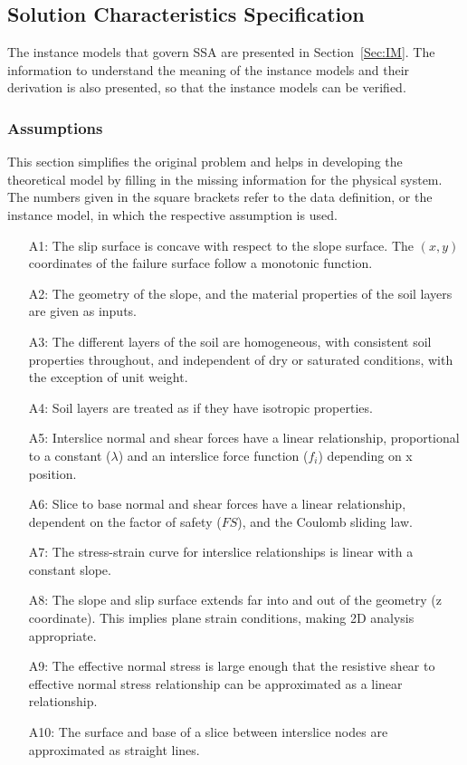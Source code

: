 \documentclass[12pt]{article}
\begin{document}
\subsection{Solution Characteristics Specification}
\label{Sec:SCS}
The instance models that govern SSA are presented in Section~\ref{Sec:IM}.  The information to understand the meaning of the instance models and their derivation is also presented, so that the instance models can be verified.
\subsubsection{Assumptions}
\label{Sec:A}
This section simplifies the original problem and helps in developing the theoretical model by filling in the missing information for the physical system. The numbers given in the square brackets refer to the data definition, or the instance model, in which the respective assumption is used.
\begin{itemize}
\item[A1:]The slip surface is concave with respect to the slope surface. The $(x,y)$ coordinates of the failure surface follow a monotonic function.
\item[A2:]The geometry of the slope, and the material properties of the soil layers are given as inputs.
\item[A3:]The different layers of the soil are homogeneous, with consistent soil properties throughout, and independent of dry or saturated conditions, with the exception of unit weight.
\item[A4:]Soil layers are treated as if they have isotropic properties.
\item[A5:]Interslice normal and shear forces have a linear relationship, proportional to a constant ($\lambda{}$) and an interslice force function ($f_{i}$) depending on x position.
\item[A6:]Slice to base normal and shear forces have a linear relationship, dependent on the factor of safety ($FS$), and the Coulomb sliding law.
\item[A7:]The stress-strain curve for interslice relationships is linear with a constant slope.
\item[A8:]The slope and slip surface extends far into and out of the geometry (z coordinate). This implies plane strain conditions, making 2D analysis appropriate.
\item[A9:]The effective normal stress is large enough that the resistive shear to effective normal stress relationship can be approximated as a linear relationship.
\item[A10:]The surface and base of a slice between interslice nodes are approximated as straight lines.
\end{itemize}
\end{document}
